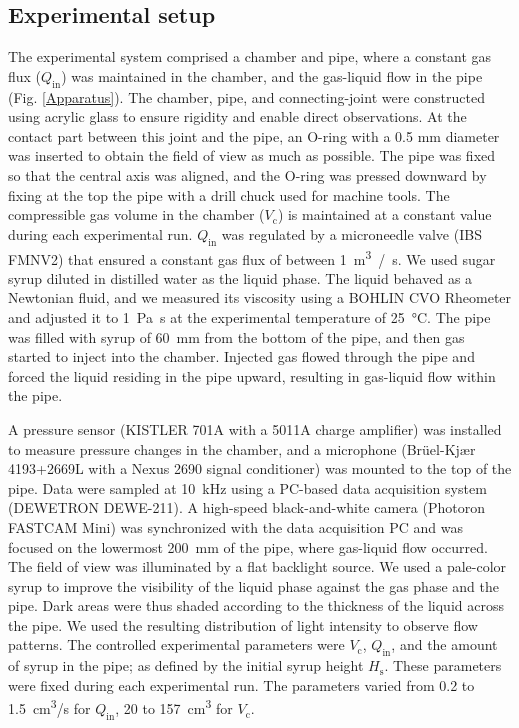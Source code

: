 \documentclass[aps,pre,preprint,groupedaddress,showkeys]{revtex4-2}
\begin{document}
\subsection{Experimental setup}\label{setup}
The experimental system comprised a chamber and pipe, where a constant gas flux ($Q_\mathrm{in}$) was maintained in the chamber, and the gas-liquid flow in the pipe (Fig. \ref{Apparatus}). 
The chamber, pipe, and connecting-joint were constructed using acrylic glass to ensure rigidity and enable direct observations.
At the contact part between this joint and the pipe, an O-ring with a 0.5 mm diameter was inserted to obtain the field of view as much as possible.
The pipe was fixed so that the central axis was aligned, and the O-ring was pressed downward by fixing at the top the pipe with a drill chuck used for machine tools.
The compressible gas volume in the chamber ($V_\mathrm{c}$) is maintained at a constant value during each experimental run.
$Q_\mathrm{in}$ was regulated by a microneedle valve (IBS FMNV2) that ensured a constant gas flux of between \SI{1}{\m^3 /s}. 
We used sugar syrup diluted in distilled water as the liquid phase. 
The liquid behaved as a Newtonian fluid, and we measured its viscosity using a BOHLIN CVO Rheometer and adjusted it to \SI{1}{\Pa \s} at the experimental temperature of \SI{25}{\degreeCelsius}.
The pipe was filled with syrup of \SI{60}{mm} from the bottom of the pipe, and then gas started to inject into the chamber.
Injected gas flowed through the pipe and forced the liquid residing in the pipe upward, resulting in gas-liquid flow within the pipe.

A pressure sensor (KISTLER 701A with a 5011A charge amplifier) was installed to measure pressure changes in the chamber, and a microphone (Br\"uel-Kj\ae r 4193+2669L with a Nexus 2690 signal conditioner) was mounted to the top of the pipe. 
Data were sampled at \SI{10}{kHz} using a PC-based data acquisition system (DEWETRON DEWE-211).
A high-speed black-and-white camera (Photoron FASTCAM Mini) was synchronized with the data acquisition PC and was focused on the lowermost \SI{200}{\mm} of the pipe, where gas-liquid flow occurred.
The field of view was illuminated by a flat backlight source. We used a pale-color syrup to improve the visibility of the liquid phase against the gas phase and the pipe. 
Dark areas were thus shaded according to the thickness of the liquid across the pipe. 
We used the resulting distribution of light intensity to observe flow patterns.
The controlled experimental parameters were $V_\mathrm{c}$, $Q_\mathrm{in}$, and the amount of syrup in the pipe; as defined by the initial syrup height $H_\mathrm{s}$. 
These parameters were fixed during each experimental run. 
The parameters varied from 0.2 to \SI{1.5}{cm^3/s} for $Q_\mathrm{in}$, 20 to \SI{157} {\cm^3} for $V_\mathrm{c}$.
\end{document}
